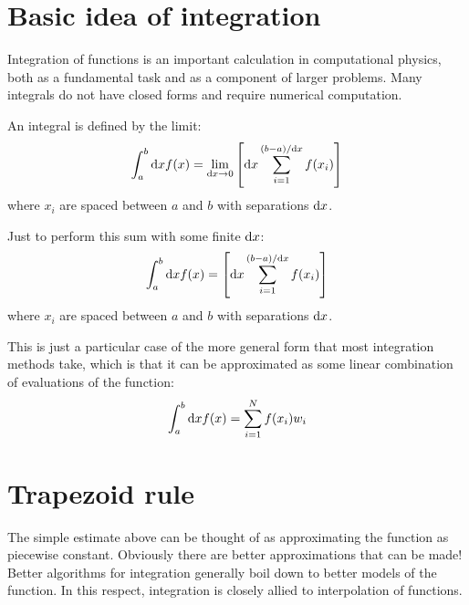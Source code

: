 \section{Basic idea of integration}

Integration of functions is an important calculation in computational
physics, both as a fundamental task and as a component of larger
problems. Many integrals do not have closed forms and require
numerical computation.


\begin{answer}
An integral is defined by the limit:
\begin{equation}
\int_a^b {\rm d}x f(x) = \lim_{{\rm d}x \rightarrow 0} \left[{\rm d}x
  \sum_{i=1}^{(b-a)/{\rm d}x} f(x_i) \right]
\end{equation}
where $x_i$ are spaced between $a$ and $b$ with separations ${\rm
  d}x$.
\end{answer}


\begin{answer}
Just to perform this sum with some finite ${\rm d}x$:
\begin{equation}
\int_a^b {\rm d}x f(x) = \left[{\rm d}x \sum_{i=1}^{(b-a)/{\rm d}x}
  f(x_i) \right]
\end{equation}
where $x_i$ are spaced between $a$ and $b$ with separations ${\rm
  d}x$.
\end{answer}

This is just a particular case of the more general form that most
integration methods take, which is that it can be approximated as some
linear combination of evaluations of the function:
\begin{equation}
  \int_a^b {\rm d}x f(x) = \sum_{i=1}^N 
  f(x_i) w_i
\end{equation}

\section{Trapezoid rule}

The simple estimate above can be thought of as approximating the
function as piecewise constant. Obviously there are better
approximations that can be made! Better algorithms for integration
generally boil down to better models of the function. In this respect,
integration is closely allied to interpolation of functions.


